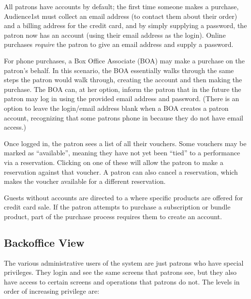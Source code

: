 All patrons have accounts by default; the first time someone makes a
purchase, Audience1st must collect an email address (to contact them
about their order) and a billing address for the credit card, and by
simply supplying a password, the patron now has an account (using their
email address as the login).  Online purchases \emph{require} the patron
to give an email address and supply a password.

For phone purchases, a Box Office Associate (BOA) may make a purchase on
the patron's behalf.  In this scenario, the BOA essentially walks
through the same steps the patron would walk through, creating the
account and then making the purchase.  The BOA can, at her option,
inform the patron that in the future the patron  may log in using the
provided email address and password.  (There is an option to leave the
login/email address blank when a BOA creates a patron account,
recognizing that some patrons phone in because they do not have email
access.) 

Once logged in, the patron sees a list of all their vouchers.  Some
vouchers may be marked as ``available'', meaning they have not yet been
``tied'' to a performance via a reservation.  Clicking on one of these
will allow the patron to make a reservation against that voucher.
A patron can also cancel a reservation, which makes the voucher
available for a different reservation.

Guests without accounts are directed to a  where specific
products are offered for credit card sale.  If the patron attempts to
purchase a subscription or bundle product, part of the purchase process
requires them to create an account.

\subsection{Backoffice View}
\label{sec:privilege-levels}

The various administrative users of the system are just patrons who have
special privileges.  They login and see the same screens that patrons
see, but they also have access to certain screens and operations that
patrons do not.  The levels in order of increasing privilege are:

